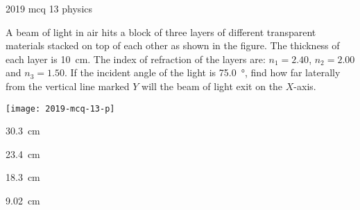 \ylDisplay
{}%
{2019}%
{mcq}%
{13}%
{physics}%
{}%
{
\ifStatement
A beam of light in air hits a block of three layers of different transparent materials stacked  on top of each other as shown in the figure. The thickness of each layer is \SI{10}{cm}. The index  of refraction of the layers are: $n_1=\num{2.40}$, $n_2=\num{2.00}$ and $n_3=\num{1.50}$. If the incident angle  of the light is \SI{75.0}{\degree}, find how far laterally from the vertical line marked $Y$ will the beam of light exit on the $X$-axis.
\begin{center}
  \texttt{[image: 2019-mcq-13-p]}
\end{center}

\fi


\SI{30.3}{\cm}
\fi


\SI{23.4}{\cm}
\fi


\SI{18.3}{\cm}
\fi


\SI{9.02}{\cm}
\fi


\ifHint

\fi


\ifSolution

\fi


\ifEstStatement

\fi



\fi



\fi



\fi



\fi


\ifEstHint

\fi


\ifEstSolution

\fi
}
